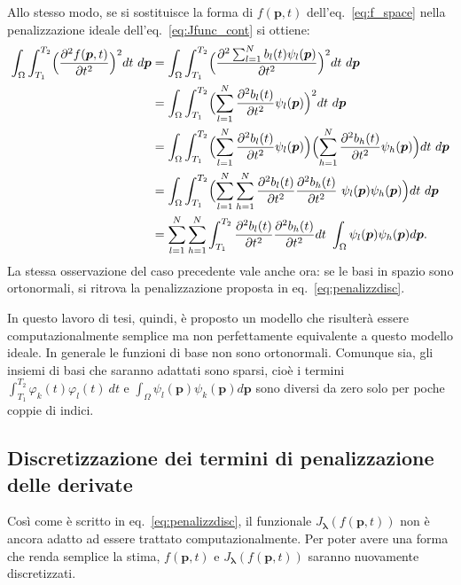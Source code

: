 \documentclass[a4paper,11pt,twoside,openright]{book}							%
\begin{document}
Allo stesso modo, se si sostituisce la forma di $f(\bm p,t)$ dell'eq.~\ref{eq:f_space} nella penalizzazione ideale dell'eq.~\ref{eq:Jfunc_cont} si ottiene:
\begin{equation} 
\label{eq:espansione_funzinf_sp}
\begin{split}
\int_\Omega \int_{T_1}^{T_2} \Bigl( \frac{\partial^2 f(\bm p, t) }{\partial t ^2} \Bigr)^2 dt\ d\bm p 
&=\int_\Omega \int_{T_1}^{T_2} \Bigl( \frac{\partial^2 \sum_{l=1}^N b_l(t)\psi_l(\bm p) }{\partial t ^2} \Bigr)^2 dt\ d\bm p \\
&=\int_\Omega \int_{T_1}^{T_2} \Bigl( \sum_{l=1}^N \frac{ \partial^2b_l(t)}{\partial t ^2}\psi_l(\bm p)  \Bigr)^2 dt\ d\bm p  \\
&=\int_\Omega \int_{T_1}^{T_2} \Bigl( \sum_{l=1}^N \frac{ \partial^2b_l(t)}{\partial t ^2}\psi_l(\bm p)  \Bigr)\Bigl( \sum_{h=1}^N \frac{ \partial^2b_h(t)}{\partial t ^2}\psi_h(\bm p)  \Bigr) dt\ d\bm p \\
&= \int_\Omega \int_{T_1}^{T_2} \Bigl( \sum_{l=1}^N \sum_{h=1}^N \frac{ \partial^2b_l(t)}{\partial t ^2}\frac{ \partial^2b_h(t)}{\partial t ^2}\   \psi_l(\bm p)  \psi_h(\bm p)  \Bigr) dt\ d\bm p \\
&=\sum_{l=1}^N \sum_{h=1}^N  \int_{T_1}^{T_2}  \frac{ \partial^2b_l(t)}{\partial t ^2}\frac{ \partial^2b_h(t)}{\partial t ^2}dt\  \int_\Omega \psi_l(\bm p)  \psi_h(\bm p)    d\bm p .
\end{split}
\end{equation}
La stessa osservazione del caso precedente vale anche ora: se le basi in spazio sono ortonormali, si ritrova la penalizzazione proposta in eq.~\ref{eq:penalizzdisc}. 

In questo lavoro di tesi, quindi, è proposto un modello che risulterà essere computazionalmente semplice ma non perfettamente equivalente a questo modello ideale. In generale le funzioni di base non sono ortonormali. Comunque sia, gli insiemi di basi che saranno adattati sono sparsi, cioè i termini $ \int_{T_1}^{T_2} \varphi_k(t)\varphi_l(t)\ dt $ e $\int_\Omega \psi_l(\bm p)  \psi_k(\bm p)d\bm p$ sono diversi da zero solo per poche coppie di indici.






\subsection{Discretizzazione dei termini di penalizzazione delle derivate}
Così come è scritto in eq.~\ref{eq:penalizzdisc}, il funzionale $J_{\bm \lambda }(f(\bm{p},t))$ non è ancora adatto ad essere trattato computazionalmente. Per poter avere una forma che renda semplice la stima, $f(\bm{p},t)$ e $J_{\bm \lambda }(f(\bm{p},t))$ saranno nuovamente discretizzati. 
\end{document}
